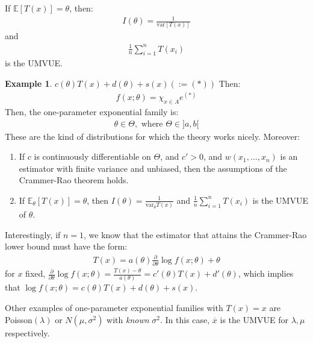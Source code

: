 \documentclass[11pt]{scrartcl}
\theoremstyle{definition}
\newtheorem{ex}{Example}
\theoremstyle{remark}
\newcommand{\EX}[1]{\mathbb{E}\left[#1 \right]}
\newcommand{\EXth}[1]{\mathbb{E}_\theta \left[ #1 \right]}
\begin{document}
If $\EX{T(x)} = \theta$, then: 
\begin{align*}
	I(\theta) = \frac{1}{\text{var}[T(x)]}	
\end{align*}
and
\begin{align*}
	\frac{1}{n} \sum_{i=1}^n T(x_i) 	
\end{align*}
is the UMVUE. 


\begin{ex} 
	$c(\theta)T(x) + d(\theta) + s(x) (:= (*)) $ Then: 
	\begin{align*}
		f(x; \theta) = \chi_{x \in A} e^{(*)} 	
	\end{align*}
	Then, the one-parameter exponential family is: 
	\begin{align*}
		\theta \in \Theta, \text{ where } \Theta \in ]a,b[ 	
	\end{align*}
	These are the kind of distributions for which the theory works nicely. Moreover: 
	\begin{enumerate}[noitemsep]
		\item If $c$ is continuously differentiable on $\Theta$, and $c' > 0$, and $w(x_1, ..., x_n)$ is an estimator with finite variance and unbiased, then the assumptions of the Crammer-Rao theorem holds. 
		\item If $\EXth{T(x)} = \theta$, then $I(\theta) = \frac{1}{\text{var}_\theta T(x)}$ and $\frac{1}{n} \sum_{i=1}^n T(x_i)$ is the UMVUE of $\theta$. 
	\end{enumerate}
	Interestingly, if $n=1$, we know that the estimator that attains the Crammer-Rao lower bound must have the form: 
	\begin{align*}
		T(x) = a (\theta) \frac{\partial}{\partial \theta} \log f(x; \theta) + \theta 	
	\end{align*}
	for $x$ fixed, $\frac{\partial}{\partial \theta} \log f(x; \theta) = \frac{T(x) - \theta}{a(\theta)} = c'(\theta)T(x) + d'(\theta)$, which implies that $\log f(x; \theta) = c(\theta)T(x) + d(\theta) + s(x)$. 
	
	Other examples of one-parameter exponential families with $T(x) = x$ are Poisson$(\lambda)$ or $N(\mu, \sigma^2)$ with \emph{known} $\sigma^2$. In this case, $\overline{x}$ is the UMVUE for $\lambda, \mu$ respectively. 
\end{ex}
\end{document}
